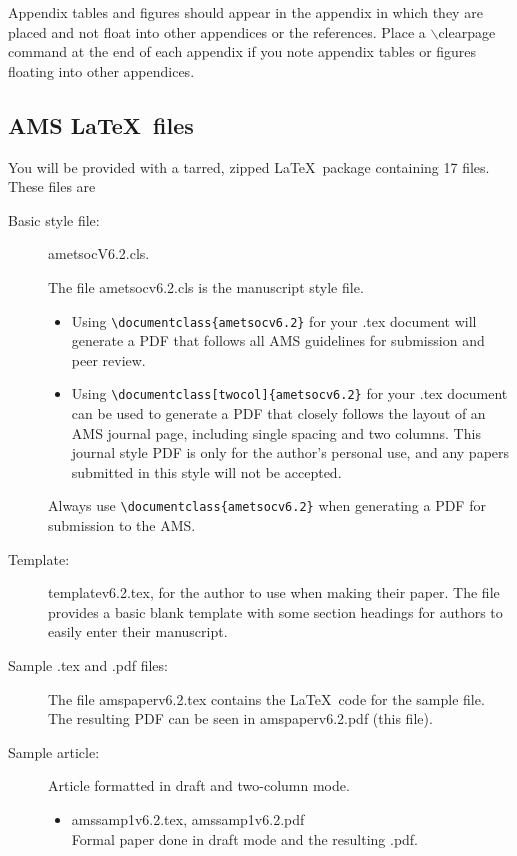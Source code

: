 \documentclass{ametsocV6.2}
\begin{document}
Appendix tables and figures should appear in the appendix in which they are placed and not 
float into other appendices or the references. Place a $\backslash$clearpage command at the 
end of each appendix if  you note appendix tables or figures floating into other appendices. 

\appendix[B]

\subsection{AMS \LaTeX\ files}
You will be provided with a tarred, zipped \LaTeX\ package containing 
17 files. These files are

\begin{description}
\item[Basic style file:] ametsocV6.2.cls. 

The file ametsocv6.2.cls is the manuscript style file.  

\begin{itemize}
\item
Using \verb+\documentclass{ametsocv6.2}+ for your .tex document
will 
generate a PDF that follows all AMS guidelines for submission and peer
review.  

\item
Using \verb+\documentclass[twocol]{ametsocv6.2}+ for your .tex document
can be used to generate a PDF that closely
follows the layout of an AMS journal page, including single spacing and two
columns.  This journal style PDF is only for the author's personal use, and
any papers submitted in this style will not be accepted.  
\end{itemize}
Always use \verb+\documentclass{ametsocv6.2}+ 
when generating a PDF for submission to the AMS. 

\item[Template:]
templatev6.2.tex, for the author to use when making their
paper.
The file provides a basic blank template with some
section headings for authors to easily enter their manuscript.

\item[Sample .tex and .pdf files:]
The file amspaperv6.2.tex contains the \LaTeX\ code for the sample file.  
The resulting PDF can be seen in amspaperv6.2.pdf (this file).


\item[Sample article:] Article formatted in draft and two-column mode.

\begin{itemize}
\item
amssamp1v6.2.tex, amssamp1v6.2.pdf\\
Formal paper done in draft mode and the resulting .pdf.


\end{itemize}
\end{description}
\end{document}
